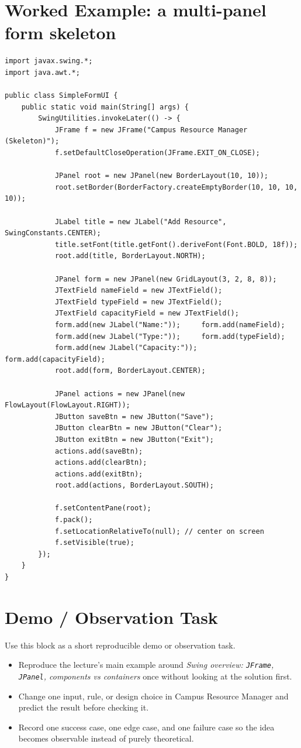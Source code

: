 \documentclass[11pt]{article}
\begin{document}
\section{Worked Example: a multi-panel form skeleton}
\begin{lstlisting}
import javax.swing.*;
import java.awt.*;

public class SimpleFormUI {
    public static void main(String[] args) {
        SwingUtilities.invokeLater(() -> {
            JFrame f = new JFrame("Campus Resource Manager (Skeleton)");
            f.setDefaultCloseOperation(JFrame.EXIT_ON_CLOSE);

            JPanel root = new JPanel(new BorderLayout(10, 10));
            root.setBorder(BorderFactory.createEmptyBorder(10, 10, 10, 10));

            JLabel title = new JLabel("Add Resource", SwingConstants.CENTER);
            title.setFont(title.getFont().deriveFont(Font.BOLD, 18f));
            root.add(title, BorderLayout.NORTH);

            JPanel form = new JPanel(new GridLayout(3, 2, 8, 8));
            JTextField nameField = new JTextField();
            JTextField typeField = new JTextField();
            JTextField capacityField = new JTextField();
            form.add(new JLabel("Name:"));     form.add(nameField);
            form.add(new JLabel("Type:"));     form.add(typeField);
            form.add(new JLabel("Capacity:")); form.add(capacityField);
            root.add(form, BorderLayout.CENTER);

            JPanel actions = new JPanel(new FlowLayout(FlowLayout.RIGHT));
            JButton saveBtn = new JButton("Save");
            JButton clearBtn = new JButton("Clear");
            JButton exitBtn = new JButton("Exit");
            actions.add(saveBtn);
            actions.add(clearBtn);
            actions.add(exitBtn);
            root.add(actions, BorderLayout.SOUTH);

            f.setContentPane(root);
            f.pack();
            f.setLocationRelativeTo(null); // center on screen
            f.setVisible(true);
        });
    }
}
\end{lstlisting}

\section{Demo / Observation Task}
Use this block as a short reproducible demo or observation task.
\begin{itemize}
  \item Reproduce the lecture's main example around \textit{Swing overview: \texttt{JFrame}, \texttt{JPanel}, components vs containers} once without looking at the solution first.
  \item Change one input, rule, or design choice in Campus Resource Manager and predict the result before checking it.
  \item Record one success case, one edge case, and one failure case so the idea becomes observable instead of purely theoretical.
\end{itemize}
\notesources{\OOPSUnitIVSources}
\end{document}

